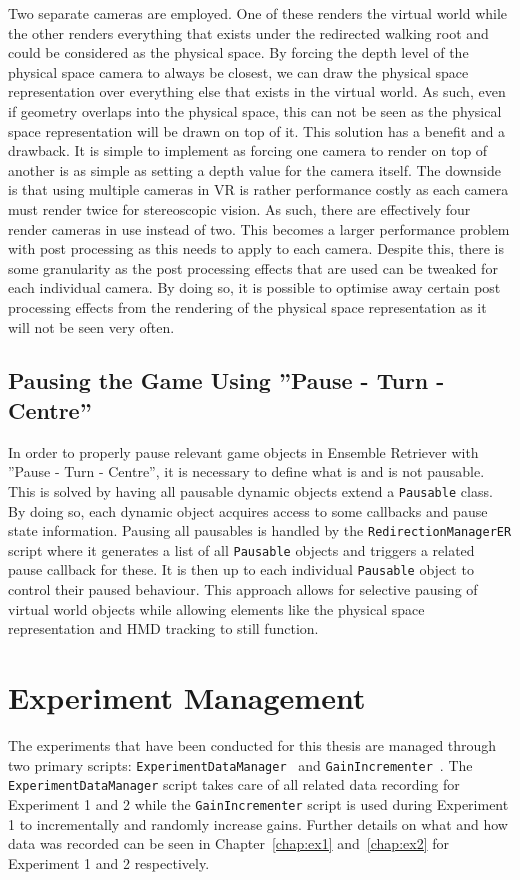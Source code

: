 Two separate cameras are employed. One of these renders the virtual world while the other renders everything that exists under the redirected walking root and could be considered as the physical space. By forcing the depth level of the physical space camera to always be closest, we can draw the physical space representation over everything else that exists in the virtual world. As such, even if geometry overlaps into the physical space, this can not be seen as the physical space representation will be drawn on top of it. This solution has a benefit and a drawback. It is simple to implement as forcing one camera to render on top of another is as simple as setting a depth value for the camera itself. The downside is that using multiple cameras in VR is rather performance costly as each camera must render twice for stereoscopic vision. As such, there are effectively four render cameras in use instead of two. This becomes a larger performance problem with post processing as this needs to apply to each camera. Despite this, there is some granularity as the post processing effects that are used can be tweaked for each individual camera. By doing so, it is possible to optimise away certain post processing effects from the rendering of the physical space representation as it will not be seen very often. 

\subsection{Pausing the Game Using ''Pause - Turn - Centre''}
In order to properly pause relevant game objects in Ensemble Retriever with ''Pause - Turn - Centre'', it is necessary to define what is and is not pausable. This is solved by having all pausable dynamic objects extend a \lstinline{Pausable} class. By doing so, each dynamic object acquires access to some callbacks and pause state information. Pausing all pausables is handled by the \lstinline{RedirectionManagerER} script where it generates a list of all \lstinline{Pausable} objects and triggers a related pause callback for these. It is then up to each individual \lstinline{Pausable} object to control their paused behaviour. This approach allows for selective pausing of virtual world objects while allowing elements like the physical space representation and HMD tracking to still function. 
 
\section{Experiment Management}
The experiments that have been conducted for this thesis are managed through two primary scripts: \lstinline{ExperimentDataManager}~\cite{experimentDataManager} and \lstinline{GainIncrementer}~\cite{gainIncrementer}. The \lstinline{ExperimentDataManager} script takes care of all related data recording for Experiment 1 and 2 while the \lstinline{GainIncrementer} script is used during Experiment 1 to incrementally and randomly increase gains. Further details on what and how data was recorded can be seen in Chapter~\ref{chap:ex1} and~\ref{chap:ex2} for Experiment 1 and 2 respectively. 

